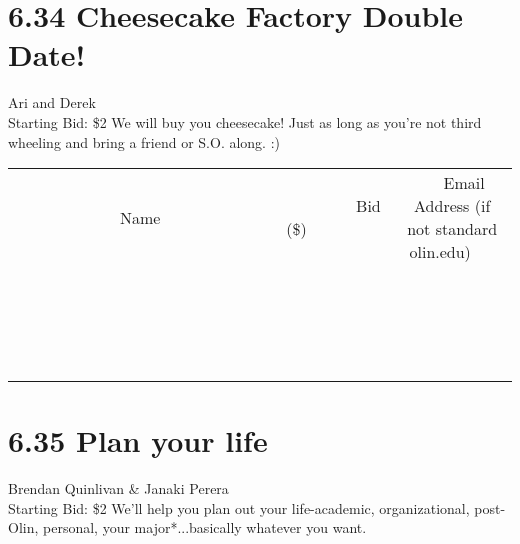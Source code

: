 \documentclass[11pt]{article}
\begin{document}
\section*{6.34 Cheesecake Factory Double Date!}
Ari and Derek
\\
Starting Bid: \$2
\newline
We will buy you cheesecake! Just as long as you're not third wheeling and bring a friend or S.O. along. :)
\\[3ex]
\begin{tabular}{c c c}
~~~~~~~~~~~~~Name~~~~~~~~~~~~~ & ~~~~~~~~~Bid (\$)~~~~~~~~~  & ~~~Email Address (if not standard olin.edu)~~~\\
 & & \\
\hline
 & & \\
\hline
 & & \\
\hline
 & & \\
\hline
 & & \\
\hline
 & & \\
\hline
 & & \\
\hline
 & & \\
\hline
 & & \\
\hline
 & & \\
\hline
 & & \\
\hline
 & & \\
\hline
 & & \\
\hline
 & & \\
\hline
 & & \\
\hline
 & & \\
\hline
 & & \\
\hline
 & & \\
\hline
 & & \\
\hline
\end{tabular}
\newpage
\section*{6.35 Plan your life}
Brendan Quinlivan \& Janaki Perera
\\
Starting Bid: \$2
\newline
We'll help you plan out your life-academic, organizational, post-Olin, personal, your major*...basically whatever you want.
\end{document}
